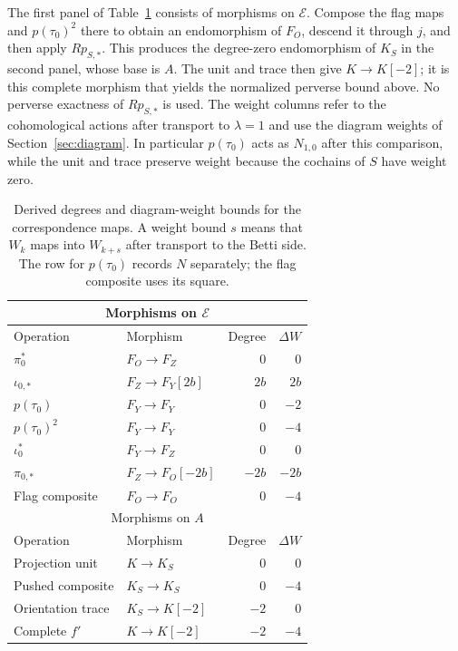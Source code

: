 The first panel of Table~\ref{spec:shift-table} consists of morphisms on
$\mathcal E$. Compose the flag maps and $p(\tau_0)^2$ there to obtain an
endomorphism of $F_O$, descend it through $j$, and then apply $Rp_{S,*}$.
This produces the degree-zero endomorphism of $K_S$ in the second panel,
whose base is $A$. The unit and trace then give $K\to K[-2]$; it is this
complete morphism that yields the normalized perverse bound above.
No perverse exactness of $Rp_{S,*}$ is used.
The weight columns refer to the cohomological actions after transport
to $\lambda=1$ and use the diagram weights of Section~\ref{sec:diagram}.
In particular $p(\tau_0)$ acts as $N_{1,0}$ after this comparison, while
the unit and trace preserve weight because the cochains of $S$ have
weight zero.

\begin{table}[htbp]
\centering
\small
\begin{tabular}{llrr}
\toprule
\multicolumn{4}{c}{Morphisms on $\mathcal E$}\\
\midrule
Operation & Morphism & Degree & $\Delta W$\\
\midrule
$\pi_0^*$ & $F_O\to F_Z$ & $0$ & $0$\\
$\iota_{0,*}$ & $F_Z\to F_Y[2b]$ & $2b$ & $2b$\\
$p(\tau_0)$ & $F_Y\to F_Y$ & $0$ & $-2$\\
$p(\tau_0)^2$ & $F_Y\to F_Y$ & $0$ & $-4$\\
$\iota_0^*$ & $F_Y\to F_Z$ & $0$ & $0$\\
$\pi_{0,*}$ & $F_Z\to F_O[-2b]$ & $-2b$ & $-2b$\\
Flag composite & $F_O\to F_O$ & $0$ & $-4$\\
\midrule
\multicolumn{4}{c}{Morphisms on $A$}\\
\midrule
Operation & Morphism & Degree & $\Delta W$\\
\midrule
Projection unit & $K\to K_S$ & $0$ & $0$\\
Pushed composite & $K_S\to K_S$ & $0$ & $-4$\\
Orientation trace & $K_S\to K[-2]$ & $-2$ & $0$\\
Complete $f'$ & $K\to K[-2]$ & $-2$ & $-4$\\
\bottomrule
\end{tabular}
\caption{Derived degrees and diagram-weight bounds for the correspondence
maps. A weight bound $s$ means that $W_k$ maps into $W_{k+s}$ after
transport to the Betti side. The row for
$p(\tau_0)$ records $N$ separately; the flag composite uses its square.}
\label{spec:shift-table}
\end{table}
